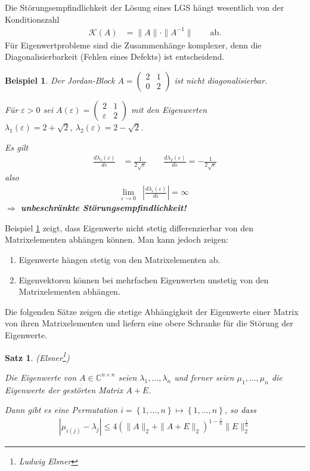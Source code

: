 \documentclass[%
a4paper,
11pt,		%
]
{scrartcl}
\newcommand{\C}{\mathbb{C}}
\theoremstyle{plain}
\theoremstyle{plain}
\newtheorem{mysatz}[mydef]{Satz}
\theoremstyle{plain}
\theoremstyle{plain}
\newtheorem{mybsp}[mydef]{Beispiel}
\begin{document}
Die Störungsempfindlichkeit der Lösung eines LGS hängt wesentlich von der Konditionszahl
\begin{align*}
  \mathcal{K}(A) & = \|A\| \cdot \|A^{-1}\| \qquad \text{ab.}
\end{align*}
Für Eigenwertprobleme sind die Zusammenhänge komplexer, denn die Diagonalisierbarkeit (Fehlen eines Defekts) ist entscheidend.
\begin{mybsp}\label{bspEWJordanBlock} Der Jordan-Block 
$A = 
\begin{pmatrix}
2 & 1\\
0 & 2
\end{pmatrix}
$
ist nicht diagonalisierbar. 

Für $\varepsilon > 0$ sei
$A(\varepsilon) = 
\begin{pmatrix}
2 & 1\\
\varepsilon & 2
\end{pmatrix}
$
mit den Eigenwerten $\lambda_1(\varepsilon)=2+\sqrt{2},\ \lambda_2(\varepsilon)=2-\sqrt{2}$.

Es gilt
\begin{align*}
\frac{d\lambda_1(\varepsilon)}{d\varepsilon} & = \frac{1}{2\sqrt{\varepsilon}} \qquad \frac{d\lambda_2(\varepsilon)}{d\varepsilon} = -\frac{1}{2\sqrt{\varepsilon}}
\end{align*}
also
\begin{align*}
\lim\limits_{\varepsilon\to0} & \left| \frac{d \lambda_i(\varepsilon)}{d \varepsilon} \right| = \infty
\end{align*}
\center $\Rightarrow$ \textbf{unbeschränkte Störungsempfindlichkeit!}
\end{mybsp}

Beispiel \ref{bspEWJordanBlock} zeigt, dass Eigenwerte nicht stetig differenzierbar von den Matrixelementen abhängen können. Man kann jedoch zeigen:
\begin{enumerate}
\item Eigenwerte hängen stetig von den Matrixelementen ab.
\item Eigenvektoren können bei mehrfachen Eigenwerten unstetig von den Matrixelementen abhängen.
\end{enumerate}

Die folgenden Sätze zeigen die stetige Abhängigkeit der Eigenwerte einer Matrix von ihren Matrixelementen und liefern eine obere Schranke für die Störung der Eigenwerte.

\begin{mysatz}(Elsner\footnote{Ludwig Elsner})

Die Eigenwerte von $A \in \C^{n \times n}$ seien $\lambda_1, \dots , \lambda_n$ und ferner seien $\mu_1, \dots , \mu_n$ die Eigenwerte der gestörten Matrix $A+E$.

Dann gibt es eine Permutation $i=\left\{ 1,\dots,n \right\} \mapsto \left\{ 1,\dots,n \right\}$, so dass
\begin{align*}
|\mu_{i(j)} - \lambda_j| \leq 4\left( \|A\|_2 + \|A+E\|_2 \right)^{1-\frac{1}{n}} \|E\|_2^{\frac{1}{n}}
\end{align*}
\end{mysatz}
\end{document}
